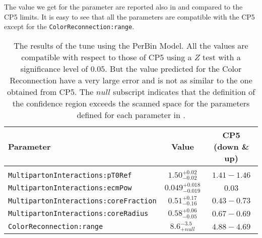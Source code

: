 The value we get for the parameter are reported also in  and compared to the CP5 limits. 
It is easy to see that all the parameters are compatible with the CP5 except for the \texttt{ColorReconnection:range}. 
\begin{table}[!htb]
\centering
	\begin{tabular}{l | c | c}
		Parameter & Value & CP5 (down \& up)\\ \hline\hline
		\\[-0.85em]		
\texttt{MultipartonInteractions:pT0Ref} & $ 1.50^{+0.02}_{-0.02}$ & $1.41 - 1.46$\\[3pt]
\texttt{MultipartonInteractions:ecmPow} & $ 0.049_{-0.019}^{+0.018} $ & $0.03$\\[3pt]
\texttt{MultipartonInteractions:coreFraction} & $ 0.51_{-0.16}^{+0.17} $ & $0.43 - 0.73$\\[3pt]
\texttt{MultipartonInteractions:coreRadius} & $ 0.58_{-0.05}^{+0.06} $ & $0.67 - 0.69$\\[3pt]
\texttt{ColorReconnection:range} & $ 8.6 ^{-3.5}_{+null} $ & $4.88 - 4.69$\\[2pt]
\end{tabular}
\caption{The results of the tune using the PerBin Model. All the values are compatible with respect to those of CP5 using a $Z$ test with a significance level of $0.05$. But the value predicted for the Color Reconnection have a very large error and is not as similar to the one obtained from CP5. The $null$ subscript indicates that the definition of the confidence region exceeds the scanned space for the parameters defined for each parameter in .}
\label{table:result_PerBin_5params}
\end{table}

